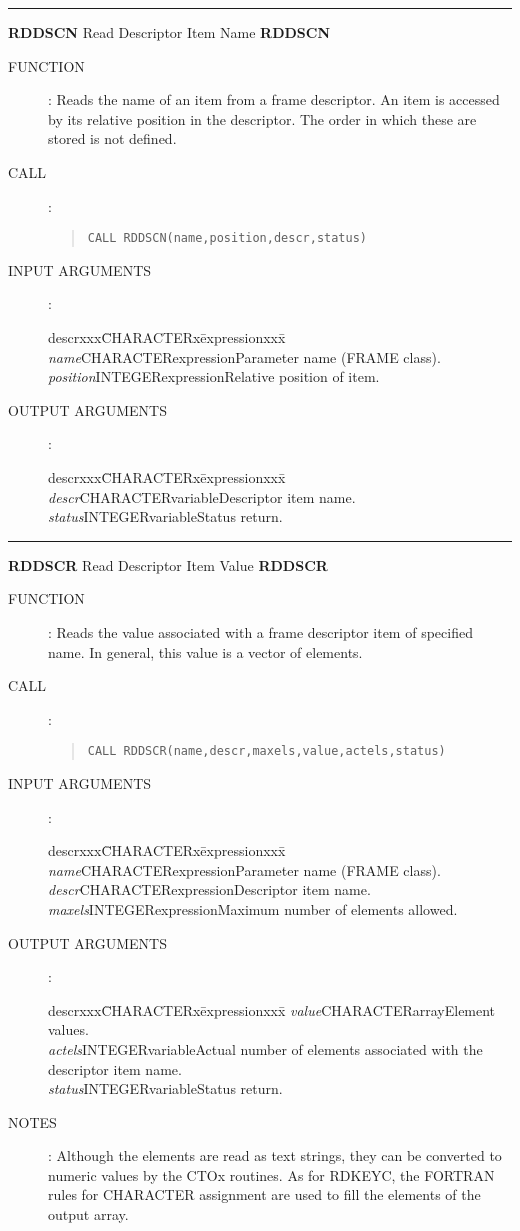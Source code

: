\documentclass{article}
\begin{document}
\rule{\textwidth}{0.3mm}
{\Large {\bf RDDSCN} \hfill Read Descriptor Item Name \hfill {\bf RDDSCN}}
\begin{description}
\item [FUNCTION]:
Reads the name of an item from a frame descriptor.
An item is accessed by its relative position in the descriptor.
The order in which these are stored is not defined.
\item [CALL]:
\begin{quote}
{\tt CALL RDDSCN(name,position,descr,status)}
\end{quote}
\item [INPUT ARGUMENTS]:
\begin{tabbing}
descrxxx\=CHARACTERx\=expressionxxx\=\kill
{\em name}\>CHARACTER\>expression\>Parameter name (FRAME class).\\
{\em position}\>INTEGER\>expression\>Relative position of item.
\end{tabbing}
\item [OUTPUT ARGUMENTS]:
\begin{tabbing}
descrxxx\=CHARACTERx\=expressionxxx\=\kill
{\em descr}\>CHARACTER\>variable\>Descriptor item name.\\
{\em status}\>INTEGER\>variable\>Status return.
\end{tabbing}
\end{description}
\rule{\textwidth}{0.3mm}
{\Large {\bf RDDSCR} \hfill Read Descriptor Item Value \hfill {\bf RDDSCR}}
\begin{description}
\item [FUNCTION]:
Reads the value associated with a frame  descriptor item of specified name.
In general, this value is a vector of elements.
\item [CALL]:
\begin{quote}
{\tt CALL RDDSCR(name,descr,maxels,value,actels,status)}
\end{quote}
\item [INPUT ARGUMENTS]:
\begin{tabbing}
descrxxx\=CHARACTERx\=expressionxxx\=\kill
{\em name}\>CHARACTER\>expression\>Parameter name (FRAME class).\\
{\em descr}\>CHARACTER\>expression\>Descriptor item name.\\
{\em maxels}\>INTEGER\>expression\>Maximum number of elements allowed.
\end{tabbing}
\item [OUTPUT ARGUMENTS]:
\begin{tabbing}
descrxxx\=CHARACTERx\=expressionxxx\=\kill
{\em value}\>CHARACTER\>array\>Element values.\\
{\em actels}\>INTEGER\>variable\>Actual number of elements associated with the\\
\>\>\>descriptor item name.\\
{\em status}\>INTEGER\>variable\>Status return.
\end{tabbing}
\item [NOTES]:
Although the elements are read as text strings, they can be converted to
numeric values by the CTOx routines.
As for RDKEYC, the FORTRAN rules for CHARACTER assignment are used to fill the
elements of the output array.
\end{description}
\end{document}
